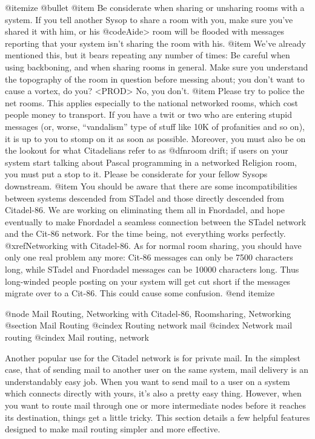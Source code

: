 {@itemize @bullet
@item
Be considerate when sharing or unsharing rooms with a
system.  If you tell another Sysop to share a room with
you, make sure you've shared it with him, or his @code{Aide>}
room will be flooded with messages reporting that your
system isn't sharing the room with his.
@item
We've already mentioned this, but it bears repeating
any number of times:  Be careful when using backboning,
and when sharing rooms in general.  Make sure you
understand the topography of the room in question before
messing about; you don't want to cause a vortex, do you?
<PROD>  No, you don't.
@item
Please try to police the net rooms.  This applies
especially to the national networked rooms, which cost
people money to transport.  If you have a twit or two
who are entering stupid messages (or, worse, ``vandalism''
type of stuff like 10K of profanities and so on), it is up
to you to stomp on it as soon as possible.  Moreover,
you must also be on the lookout for what Citadelians
refer to as @dfn{room drift}; if users on your system start
talking about Pascal programming in a networked Religion
room, you must put a stop to it.  Please be considerate
for your fellow Sysops downstream.
@item
You should be aware that there are some incompatibilities between
systems descended from STadel and those directly descended
from Citadel-86.  We are working on eliminating them all in
Fnordadel, and hope eventually to make Fnordadel a
seamless connection between the STadel network and the Cit-86
network.  For the time being, not everything works perfectly.
@xref{Networking with Citadel-86}.  As for normal room sharing, you
should have only one real problem any more:  Cit-86 messages
can only be 7500 characters long, while STadel and
Fnordadel messages can be 10000 characters long.  Thus
long-winded people posting on your system will get cut short
if the messages migrate over to a Cit-86.  This could cause
some confusion.
@end itemize

@node Mail Routing, Networking with Citadel-86, Roomsharing, Networking
@section Mail Routing
@cindex Routing network mail
@cindex Network mail routing
@cindex Mail routing, network

Another popular use for the Citadel network is for private mail.
In the simplest case, that of sending mail to another user on the same
system, mail delivery is an understandably easy job.  When you want to
send mail to a user on a system which connects directly with yours, it's
also a pretty easy thing.  However, when you want to route mail through
one or more intermediate nodes before it reaches its destination, things
get a little tricky.  This section details a few helpful features
designed to make mail routing simpler and more effective.

}
